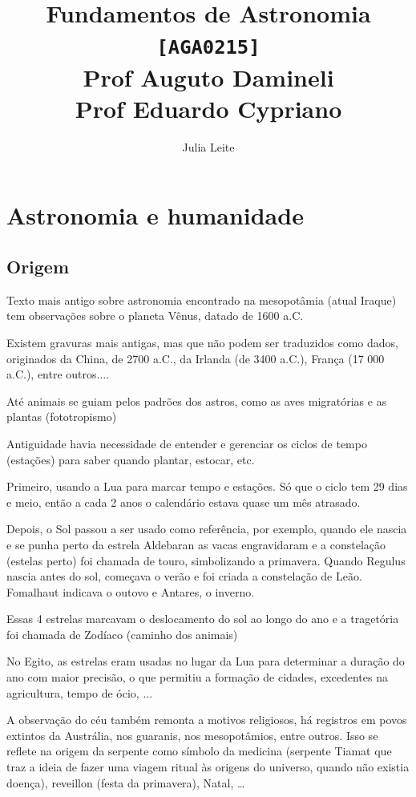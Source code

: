 \documentclass{article}
\title{Fundamentos de Astronomia\\
    \large \texttt{[AGA0215]}\\
    \large Prof Auguto Damineli\\
    \large Prof Eduardo Cypriano}
\author{Julia Leite}
\begin{document}
    
\maketitle

\tableofcontents

\newpage

\section{Astronomia e humanidade}

\subsection{Origem}

Texto mais antigo sobre astronomia encontrado na mesopotâmia (atual
Iraque) tem observações sobre o planeta Vênus, datado de 1600 a.C.

Existem gravuras mais antigas, mas que não podem ser traduzidos como 
dados, originados da China, de 2700 a.C., da Irlanda (de 3400 a.C.),
França (17 000 a.C.), entre outros....

Até animais se guiam pelos padrões dos astros, como as aves migratórias
e as plantas (fototropismo)

Antiguidade havia necessidade de entender e gerenciar os ciclos de 
tempo (estações) para saber quando plantar, estocar, etc.

Primeiro, usando a Lua para marcar tempo e estações. Só que o ciclo 
tem 29 dias e meio, então a cada 2 anos o calendário estava quase um mês
atrasado.

Depois, o Sol passou a ser usado como referência, por exemplo, quando 
ele nascia e se punha perto da estrela Aldebaran as vacas engravidaram
e a constelação (estelas perto) foi chamada de touro, simbolizando a 
primavera. Quando Regulus nascia antes do sol, começava o verão e 
foi criada a constelação de Leão. Fomalhaut indicava o outovo e Antares, o inverno. 

Essas 4 estrelas marcavam o deslocamento do sol ao longo do ano e a 
tragetória foi chamada de Zodíaco (caminho dos animais)

No Egito, as estrelas eram usadas no lugar da Lua para determinar a 
duração do ano com maior precisão, o que permitiu a formação de cidades,
excedentes na agricultura, tempo de ócio, ... 

A observação do céu também remonta a motivos religiosos, há registros 
em povos extintos da Austrália, nos guaranis, nos mesopotâmios, entre 
outros. Isso se reflete na origem da serpente como símbolo da medicina
(serpente Tiamat que traz a ideia de fazer uma viagem ritual às origens
do universo, quando não existia doença), reveillon (festa da primavera),
Natal, \dots
\end{document}
